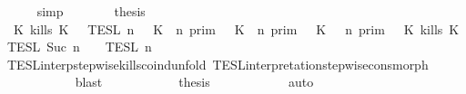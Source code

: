 \begin{isabellebody}
\ \ \ \ \isamarkupfalse%
\ simp\isanewline
\ \ \ \ \isamarkupfalse%
\ \isamarkupfalse%
\ {\isacharquery}thesis\isanewline
\ \ \ \ \ \ \isamarkupfalse%
\ {\isacharminus}\isanewline
\ \ \ \ \ \ \ \ \isamarkupfalse%
\ {\isacartoucheopen}{\isasymlbrakk}{\isasymlbrakk}\ {\isacharparenleft}K\ kills\ K\ {\isacharhash}\ {\isasymPsi}\ {\isasymrbrakk}{\isasymrbrakk}\isactrlsub T\isactrlsub E\isactrlsub S\isactrlsub L\isactrlbsup {\isasymge}\ n\isactrlesup \ {\isacharequal}\ {\isacharparenleft}{\isasymlbrakk}\ {\isacharparenleft}K\ {\isasymnot}{\isasymUp}\ n{\isacharparenright}\ {\isasymrbrakk}\isactrlsub p\isactrlsub r\isactrlsub i\isactrlsub m\ {\isasymunion}\ {\isasymlbrakk}\ {\isacharparenleft}K\ {\isasymUp}\ n{\isacharparenright}\ {\isasymrbrakk}\isactrlsub p\isactrlsub r\isactrlsub i\isactrlsub m\ {\isasyminter}\ {\isasymlbrakk}\ {\isacharparenleft}K\ {\isasymnot}{\isasymUp}\ {\isasymge}\ n{\isacharparenright}\ {\isasymrbrakk}\isactrlsub p\isactrlsub r\isactrlsub i\isactrlsub m{\isacharparenright}\ {\isasyminter}\ {\isasymlbrakk}\ {\isacharparenleft}K\ kills\ K\ {\isasymrbrakk}\isactrlsub T\isactrlsub E\isactrlsub S\isactrlsub L\isactrlbsup {\isasymge}\ Suc\ n\isactrlesup \ {\isasyminter}\ {\isasymlbrakk}{\isasymlbrakk}\ {\isasymPsi}\ {\isasymrbrakk}{\isasymrbrakk}\isactrlsub T\isactrlsub E\isactrlsub S\isactrlsub L\isactrlbsup {\isasymge}\ n\isactrlesup {\isacartoucheclose}\isanewline
\ \ \ \ \ \ \ \ \ \ \isamarkupfalse%
\ TESL{\isacharunderscore}interp{\isacharunderscore}stepwise{\isacharunderscore}kills{\isacharunderscore}coind{\isacharunderscore}unfold\ TESL{\isacharunderscore}interpretation{\isacharunderscore}stepwise{\isacharunderscore}cons{\isacharunderscore}morph\isanewline
\ \ \ \ \ \ \ \ \ \ \isamarkupfalse%
\ blast\isanewline
\ \ \ \ \ \ \ \ \isamarkupfalse%
\ \isamarkupfalse%
\ {\isacharquery}thesis\isanewline
\ \ \ \ \ \ \ \ \ \ \isamarkupfalse%
\ auto\isanewline
\ \ \ \ \ \ \isamarkupfalse%
\isanewline
\ \ \isamarkupfalse%
%
\endisatagproof
{\isafoldproof}%
%
\isadelimproof
\isanewline
%
\endisadelimproof
%
\isadelimtheory
\isanewline
%
\endisadelimtheory
%
\isatagtheory
{}\isamarkupfalse%
%
\endisatagtheory
{\isafoldtheory}%
%
\isadelimtheory
%
\endisadelimtheory
%
\end{isabellebody}%
